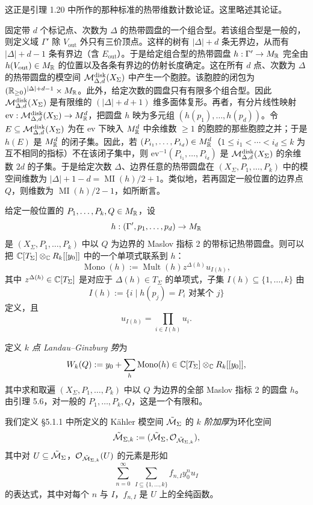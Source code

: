 这正是引理 1.20 中所作的那种标准的热带维数计数论证。这里略述其论证。

固定带 $d$ 个标记点、次数为 $\Delta$ 的热带圆盘的一个组合型。若该组合型是一般的，则定义域 $\Gamma'$ 除 $V_{\mathrm{out}}$ 外只有三价顶点。这样的树有 $|\Delta|+d$ 条无界边，从而有 $|\Delta|+d-1$ 条有界边（含 $E_{\mathrm{out}}$）。于是给定组合型的热带圆盘 $h:\Gamma'\to M_{\mathbb{R}}$ 完全由 $h(V_{\mathrm{out}})\in M_{\mathbb{R}}$ 的位置以及各条有界边的仿射长度确定。这在所有 $d$ 点、次数为 $\Delta$ 的热带圆盘的模空间 $\mathcal{M}^{\mathrm{disk}}_{\Delta,d}(X_\Sigma)$ 中产生一个胞腔。该胞腔的闭包为 $(\mathbb{R}_{\ge0})^{|\Delta|+d-1}\times M_{\mathbb{R}}$。此外，给定次数的圆盘只有有限多个组合型。因此 $\mathcal{M}^{\mathrm{disk}}_{\Delta,d}(X_\Sigma)$ 是有限维的 $(|\Delta|+d+1)$ 维多面体复形。再者，有分片线性映射 $\mathrm{ev}:\mathcal{M}^{\mathrm{disk}}_{\Delta,d}(X_\Sigma)\to M_{\mathbb{R}}^d$，把圆盘 $h$ 映为多元组 $(h(p_1),\ldots,h(p_d))$。令 $E\subseteq\mathcal{M}^{\mathrm{disk}}_{\Delta,d}(X_\Sigma)$ 为在 $\mathrm{ev}$ 下映入 $M_{\mathbb{R}}^d$ 中余维数 $\ge1$ 的胞腔的那些胞腔之并；于是 $h(E)$ 是 $M_{\mathbb{R}}^d$ 的闭子集。因此，若 $(P_{i_1},\ldots,P_{i_d})\in M_{\mathbb{R}}^d$（$1\le i_1<\cdots<i_d\le k$ 为互不相同的指标）不在该闭子集中，则 $\mathrm{ev}^{-1}(P_{i_1},\ldots,P_{i_d})$ 是 $\mathcal{M}^{\mathrm{disk}}_{\Delta,d}(X_\Sigma)$ 的余维数 $2d$ 的子集。于是给定次数 $\Delta$、边界任意的热带圆盘在 $(X_\Sigma,P_1,\ldots,P_k)$ 中的模空间维数为 $|\Delta|+1-d=\operatorname{MI}(h)/2+1$。类似地，若再固定一般位置的边界点 $Q$，则维数为 $\operatorname{MI}(h)/2-1$，如所断言。

\begin{definition}
给定一般位置的 $P_1,\ldots,P_k,Q\in M_{\mathbb{R}}$，设
\[
  h:(\Gamma',p_1,\ldots,p_d)\to M_{\mathbb{R}}
\]
是 $(X_\Sigma,P_1,\ldots,P_k)$ 中以 $Q$ 为边界的 Maslov 指标 2 的带标记热带圆盘。则可以把 $\mathbb{C}[T_\Sigma]\otimes_{\mathbb{C}} R_k[[y_0]]$ 中的一个单项式联系到 $h$：
\[
  \operatorname{Mono}(h):=\operatorname{Mult}(h)z^{\Delta(h)}u_{I(h)},
\]
其中 $z^{\Delta(h)}\in\mathbb{C}[T_\Sigma]$ 是对应于 $\Delta(h)\in T_\Sigma$ 的单项式，子集 $I(h)\subseteq\{1,\ldots,k\}$ 由
\[
  I(h):=\{i\mid h(p_j)=P_i\text{ 对某个 }j\}
\]
定义，且
\[
  u_{I(h)}=\prod_{i\in I(h)}u_i.
\]
\end{definition}

定义 \emph{$k$ 点 Landau--Ginzburg 势}为
\[
  W_k(Q):=y_0+\sum_h\operatorname{Mono}(h)\in\mathbb{C}[T_\Sigma]\otimes_{\mathbb{C}} R_k[[y_0]],
\]
其中求和取遍 $(X_\Sigma,P_1,\ldots,P_k)$ 中以 $Q$ 为边界的全部 Maslov 指标 2 的圆盘 $h$。由引理 5.6，对一般的 $P_1,\ldots,P_k,Q$，这是一个有限和。

我们定义 §5.1.1 中所定义的 Kähler 模空间 $\tilde{\mathcal{M}}_\Sigma$ 的 \emph{$k$ 阶加厚}为环化空间
\[
  \tilde{\mathcal{M}}_{\Sigma,k}:=(\tilde{\mathcal{M}}_\Sigma,\mathcal{O}_{\tilde{\mathcal{M}}_{\Sigma,k}}),
\]
其中对 $U\subseteq\tilde{\mathcal{M}}_\Sigma$，$\mathcal{O}_{\tilde{\mathcal{M}}_{\Sigma,k}}(U)$ 的元素是形如
\[
  \sum_{n=0}^{\infty}\ \sum_{I\subseteq\{1,\ldots,k\}} f_{n,I}y_0^nu_I
\]
的表达式，其中对每个 $n$ 与 $I$，$f_{n,I}$ 是 $U$ 上的全纯函数。

